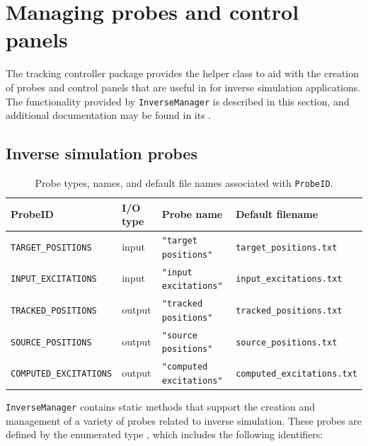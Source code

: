 \section{Managing probes and control panels}
\label{InverseManager:sec}

The tracking controller package provides the helper class
 to aid with the
creation of probes and control panels that are useful in for inverse simulation
applications. The functionality provided by {\tt InverseManager} is described
in this section, and additional documentation may be found in its
.

\subsection{Inverse simulation probes}
\label{InverseManagerProbes:sec}

\begin{table}[h]
\begin{center}
\begin{tabular}{|llll|}
\hline
ProbeID & I/O type & Probe name & Default filename \\
\hline
{\tt TARGET\_POSITIONS} & input & {\tt "target positions"} &
{\tt target\_positions.txt} \\
{\tt INPUT\_EXCITATIONS} & input & {\tt "input excitations"} &
{\tt input\_excitations.txt} \\
{\tt TRACKED\_POSITIONS} & output & {\tt "tracked positions"} &
{\tt tracked\_positions.txt} \\
{\tt SOURCE\_POSITIONS} & output & {\tt "source positions"} &
{\tt source\_positions.txt} \\
{\tt COMPUTED\_EXCITATIONS} & output & {\tt "computed excitations"} &
{\tt computed\_excitations.txt} \\
\hline
\end{tabular}
\end{center}
\caption{Probe types, names, and default file names associated 
with {\tt ProbeID}.}
\label{ProbeData:tab}
\end{table}

{\tt InverseManager} contains static methods that support the creation and
management of a variety of probes related to inverse simulation. These probes
are defined by the enumerated type
,
which includes the following identifiers:

